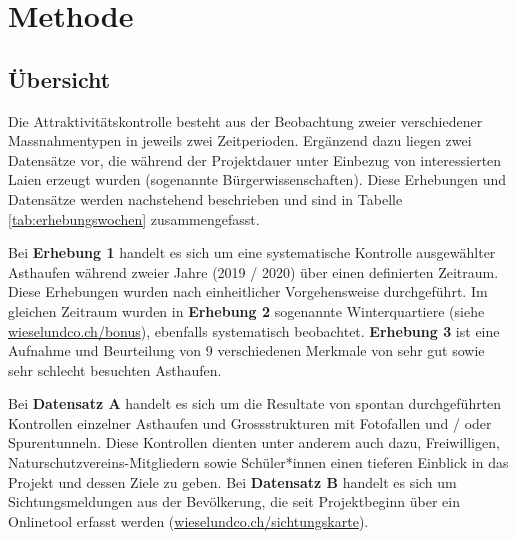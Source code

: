 \documentclass[
  oneside]{scrbook}
\begin{document}
\hypertarget{methode}{%
\chapter{Methode}\label{methode}}

\hypertarget{uxfcbersicht}{%
\section{Übersicht}\label{uxfcbersicht}}

Die Attraktivitätskontrolle besteht aus der Beobachtung zweier verschiedener Massnahmentypen in jeweils zwei Zeitperioden. Ergänzend dazu liegen zwei Datensätze vor, die während der Projektdauer unter Einbezug von interessierten Laien erzeugt wurden (sogenannte Bürgerwissenschaften). Diese Erhebungen und Datensätze werden nachstehend beschrieben und sind in Tabelle \ref{tab:erhebungswochen} zusammengefasst.

Bei \textbf{Erhebung 1} handelt es sich um eine systematische Kontrolle ausgewählter Asthaufen während zweier Jahre (2019 / 2020) über einen definierten Zeitraum. Diese Erhebungen wurden nach einheitlicher Vorgehensweise durchgeführt. Im gleichen Zeitraum wurden in \textbf{Erhebung 2} sogenannte Winterquartiere (siehe \href{http://www.wieselundco.ch/bonus}{wieselundco.ch/bonus}), ebenfalls systematisch beobachtet. \textbf{Erhebung 3} ist eine Aufnahme und Beurteilung von 9 verschiedenen Merkmale von sehr gut sowie sehr schlecht besuchten Asthaufen.

Bei \textbf{Datensatz A} handelt es sich um die Resultate von spontan durchgeführten Kontrollen einzelner Asthaufen und Grossstrukturen mit Fotofallen und / oder Spurentunneln. Diese Kontrollen dienten unter anderem auch dazu, Freiwilligen, Naturschutzvereins-Mitgliedern sowie Schüler*innen einen tieferen Einblick in das Projekt und dessen Ziele zu geben. Bei \textbf{Datensatz B} handelt es sich um Sichtungsmeldungen aus der Bevölkerung, die seit Projektbeginn über ein Onlinetool erfasst werden (\href{http://www.wieselundco.ch/beobachtung}{wieselundco.ch/sichtungskarte}).
\end{document}
